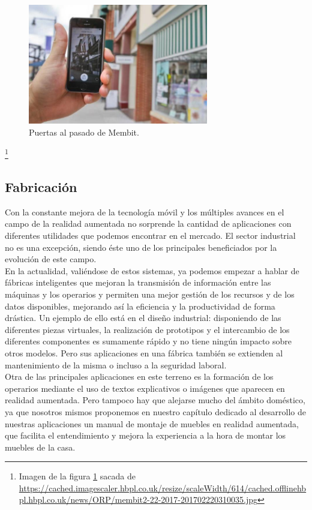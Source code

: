 \begin{figure}[H]
     \centering
     \includegraphics[width=0.7\textwidth]{Images/membit2-22-2017-201702220310035.jpg}
     \caption{Puertas al pasado de Membit.}
     \label{fig:Membit}
 \end{figure}
 {\let\thefootnote\relax\footnote{{Imagen de la figura \ref{fig:Membit} sacada de \url{https://cached.imagescaler.hbpl.co.uk/resize/scaleWidth/614/cached.offlinehbpl.hbpl.co.uk/news/ORP/membit2-22-2017-201702220310035.jpg}}}}

\subsection{Fabricación}
Con la constante mejora de la tecnología móvil y los múltiples avances en el campo de la realidad aumentada no sorprende la cantidad de aplicaciones con diferentes utilidades que podemos encontrar en el mercado. El sector industrial no es una excepción, siendo éste uno de los principales beneficiados por la evolución de este campo. \\

En la actualidad, valiéndose de estos sistemas, ya podemos empezar a hablar de fábricas inteligentes que mejoran la transmisión de información entre las máquinas y los operarios y permiten una mejor gestión de los recursos y de los datos disponibles, mejorando así la eficiencia y la productividad de forma drástica. Un ejemplo de ello está en el diseño industrial: disponiendo de las diferentes piezas virtuales, la realización de prototipos y el intercambio de los diferentes componentes es sumamente rápido y no tiene ningún impacto sobre otros modelos. Pero sus aplicaciones en una fábrica también se extienden al mantenimiento de la misma o incluso a la seguridad laboral.\cite{Neosentec_Fab}\\ 

Otra de las principales aplicaciones en este terreno es la formación de los operarios mediante el uso de textos explicativos o imágenes que aparecen en realidad aumentada. Pero tampoco hay que alejarse mucho del ámbito doméstico, ya que nosotros mismos proponemos en nuestro capítulo dedicado al desarrollo de nuestras aplicaciones un manual de montaje de muebles en realidad aumentada, que facilita el entendimiento y mejora la experiencia a la hora de montar los muebles de la casa.\\

